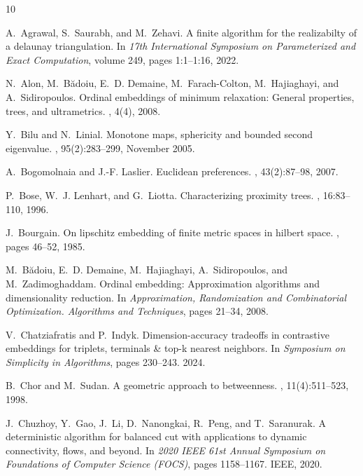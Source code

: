 \documentclass[11pt]{article}
\begin{document}
\begin{thebibliography}{10}

A.~Agrawal, S.~Saurabh, and M.~Zehavi.
\newblock A finite algorithm for the realizabilty of a delaunay triangulation.
\newblock In {\em 17th International Symposium on Parameterized and Exact Computation}, volume 249, pages 1:1--1:16, 2022.

N.~Alon, M.~B\u{a}doiu, E.~D. Demaine, M.~Farach-Colton, M.~Hajiaghayi, and A.~Sidiropoulos.
\newblock Ordinal embeddings of minimum relaxation: General properties, trees, and ultrametrics.
, 4(4), 2008.

Y.~Bilu and N.~Linial.
\newblock Monotone maps, sphericity and bounded second eigenvalue.
, 95(2):283--299, November 2005.

A.~Bogomolnaia and J.-F. Laslier.
\newblock Euclidean preferences.
, 43(2):87--98, 2007.

P.~Bose, W.~J. Lenhart, and G.~Liotta.
\newblock Characterizing proximity trees.
, 16:83--110, 1996.

J.~Bourgain.
\newblock On lipschitz embedding of finite metric spaces in hilbert space.
, pages 46--52, 1985.

M.~Bădoiu, E.~D. Demaine, M.~Hajiaghayi, A.~Sidiropoulos, and M.~Zadimoghaddam.
\newblock Ordinal embedding: Approximation algorithms and dimensionality reduction.
\newblock In {\em Approximation, Randomization and Combinatorial Optimization. Algorithms and Techniques}, pages 21--34, 2008.

V.~Chatziafratis and P.~Indyk.
\newblock Dimension-accuracy tradeoffs in contrastive embeddings for triplets, terminals \& top-k nearest neighbors.
\newblock In {\em Symposium on Simplicity in Algorithms}, pages 230--243. 2024.

B.~Chor and M.~Sudan.
\newblock A geometric approach to betweenness.
, 11(4):511--523, 1998.

J.~Chuzhoy, Y.~Gao, J.~Li, D.~Nanongkai, R.~Peng, and T.~Saranurak.
\newblock A deterministic algorithm for balanced cut with applications to dynamic connectivity, flows, and beyond.
\newblock In {\em 2020 IEEE 61st Annual Symposium on Foundations of Computer Science (FOCS)}, pages 1158--1167. IEEE, 2020.


\end{thebibliography}
\end{document}
